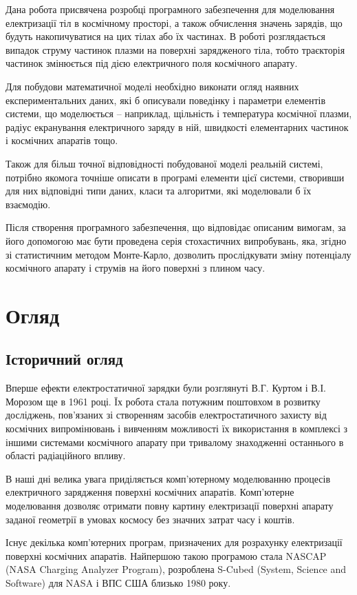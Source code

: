 \documentclass[a4paper,12pt]{article}
\begin{document}
Дана робота присвячена розробці програмного забезпечення для моделювання електризації тіл в космічному просторі, а також обчислення значень зарядів, що будуть накопичуватися на цих тілах або їх частинах. В роботі розглядається випадок струму частинок плазми на поверхні зарядженого тіла, тобто траєкторія частинок змінюється під дією електричного поля космічного апарату.

Для побудови математичної моделі необхідно виконати огляд наявних експериментальних даних, які б описували поведінку і параметри елементів системи, що моделюється -- наприклад, щільність і температура космічної плазми, радіус екранування електричного заряду в ній, швидкості елементарних частинок і космічних апаратів тощо.
 
Також для більш точної відповідності побудованої моделі реальній системі, потрібно якомога точніше описати в програмі елементи цієї системи, створивши для них відповідні типи даних, класи та алгоритми, які моделювали б їх взаємодію.

Після створення програмного забезпечення, що відповідає описаним вимогам, за його допомогою має бути проведена серія стохастичних випробувань, яка, згідно зі статистичним методом Монте-Карло, дозволить прослідкувати зміну потенціалу космічного апарату і струмів на його поверхні з плином часу.

\newpage

\section{Огляд}
\subsection{Історичний огляд}
Вперше ефекти електростатичної зарядки були розглянуті В.Г. Куртом і В.І. Морозом ще в 1961 році. Їх робота стала потужним поштовхом в розвитку досліджень, пов’язаних зі створенням засобів електростатичного захисту від космічних випромінювань і вивченням можливості їх використання в комплексі з іншими системами космічного апарату при тривалому знаходженні останнього в області радіаційного впливу.

В наші дні велика увага приділяється комп’ютерному моделюванню процесів електричного зарядження  поверхні космічних апаратів. Комп’ютерне моделювання дозволяє отримати повну картину електризації поверхні апарату заданої геометрії в умовах космосу без значних затрат часу і коштів.

Існує декілька комп’ютерних програм, призначених для розрахунку електризації поверхні космічних апаратів. Найпершою такою програмою стала NASCAP (NASA Charging Analyzer Program), розроблена S-Cubed (System, Science and Software) для NASA і ВПС США близько 1980 року.
\end{document}
